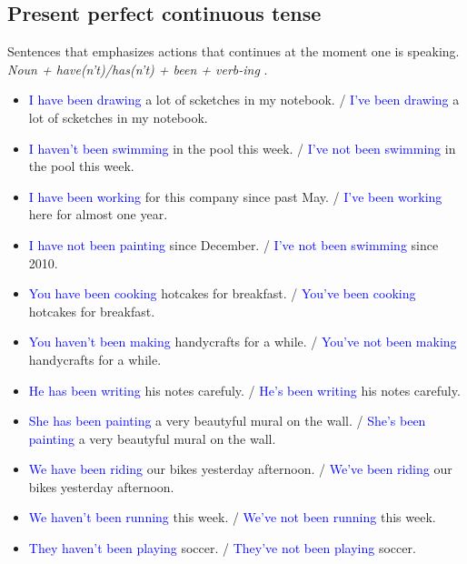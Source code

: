 \subsection{Present perfect continuous tense}
\begin{multicols}{2}
Sentences that emphasizes actions that continues at the moment one is speaking.\\
\emph{Noun + have(n't)/has(n't) + been + verb-ing }.\\

\begin{itemize}
\item \textcolor{blue}{I have been drawing} a lot of scketches in my notebook. / \textcolor{blue}{I've been drawing} a lot of scketches in my notebook.
\item \textcolor{blue}{I haven't been swimming} in the pool this week. / \textcolor{blue}{I've not been swimming} in the pool this week.
\item \textcolor{blue}{I have been working} for this company since past May. / \textcolor{blue}{I've been working} here for almost one year.
\item \textcolor{blue}{I have not been painting} since December. / \textcolor{blue}{I've not been swimming} since 2010.
\item \textcolor{blue}{You have been cooking} hotcakes for breakfast. / \textcolor{blue}{You've been cooking} hotcakes for breakfast.
\item \textcolor{blue}{You haven't been making} handycrafts for a while. / \textcolor{blue}{You've not been making} handycrafts for a while.
\item \textcolor{blue}{He has been writing} his notes carefuly. / \textcolor{blue}{He's been writing} his notes carefuly.
\item \textcolor{blue}{She has been painting} a very beautyful mural on the wall. / \textcolor{blue}{She's been painting} a very beautyful mural on the wall.
\item \textcolor{blue}{We have been riding} our bikes yesterday afternoon. / \textcolor{blue}{We've been riding} our bikes yesterday afternoon.
\item \textcolor{blue}{We haven't been running} this week. / \textcolor{blue}{We've not been running} this week.
\item \textcolor{blue}{They haven't been playing} soccer. / \textcolor{blue}{They've not been playing} soccer.
\end{itemize}
\end{multicols}

